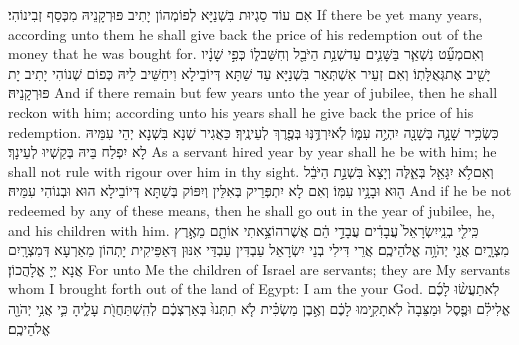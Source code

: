 {אִם עוֹד סַגְיוּת בִּשְׁנַיָּא לְפוֹמְהוֹן יָתִיב פּוּרְקָנֵיהּ מִכְּסַף זְבִינוֹהִי׃}
{If there be yet many years, according unto them he shall give back the price of his redemption out of the money that he was bought for.}{}
{וְאִם\maqqaf מְעַ֞ט נִשְׁאַ֧ר בַּשָּׁנִ֛ים עַד\maqqaf שְׁנַ֥ת הַיֹּבֵ֖ל וְחִשַּׁב\maqqaf ל֑וֹ כְּפִ֣י שָׁנָ֔יו יָשִׁ֖יב אֶת\maqqaf גְּאֻלָּתֽוֹ׃}
{וְאִם זְעֵיר אִשְׁתְּאַר בִּשְׁנַיָּא עַד שַׁתָּא דְּיוֹבֵילָא וִיחַשֵּׁיב לֵיהּ כְּפוֹם שְׁנוֹהִי יָתִיב יָת פּוּרְקָנֵיהּ׃}
{And if there remain but few years unto the year of jubilee, then he shall reckon with him; according unto his years shall he give back the price of his redemption.}{}
{כִּשְׂכִ֥יר שָׁנָ֛ה בְּשָׁנָ֖ה יִהְיֶ֣ה עִמּ֑וֹ לֹֽא\maqqaf יִרְדֶּ֥נּֽוּ בְּפֶ֖רֶךְ לְעֵינֶֽיךָ׃}
{כַּאֲגִיר שְׁנָא בִּשְׁנָא יְהֵי עִמֵּיהּ לָא יִפְלַח בֵּיהּ בְּקַשְׁיוּ לְעֵינָךְ׃}
{As a servant hired year by year shall he be with him; he shall not rule with rigour over him in thy sight.}{}
{וְאִם\maqqaf לֹ֥א יִגָּאֵ֖ל בְּאֵ֑לֶּה וְיָצָא֙ בִּשְׁנַ֣ת הַיֹּבֵ֔ל ה֖וּא וּבָנָ֥יו עִמּֽוֹ׃}
{וְאִם לָא יִתְפְּרֵיק בְּאִלֵּין וְיִפּוֹק בְּשַׁתָּא דְּיוֹבֵילָא הוּא וּבְנוֹהִי עִמֵּיהּ׃}
{And if he be not redeemed by any of these means, then he shall go out in the year of jubilee, he, and his children with him.}{}
{כִּֽי\maqqaf לִ֤י בְנֵֽי\maqqaf יִשְׂרָאֵל֙ עֲבָדִ֔ים עֲבָדַ֣י הֵ֔ם אֲשֶׁר\maqqaf הוֹצֵ֥אתִי אוֹתָ֖ם מֵאֶ֣רֶץ מִצְרָ֑יִם אֲנִ֖י יְהֹוָ֥ה אֱלֹהֵיכֶֽם׃}
{אֲרֵי דִּילִי בְנֵי יִשְׂרָאֵל עַבְדִּין עַבְדַּי אִנּוּן דְּאַפֵּיקִית יָתְהוֹן מֵאַרְעָא דְּמִצְרָֽיִם אֲנָא יְיָ אֱלָהֲכוֹן׃}
{For unto Me the children of Israel are servants; they are My servants whom I brought forth out of the land of Egypt: I am the \lord\space your God.}{}
\newperek
{}%
{לֹֽא\maqqaf תַעֲשׂ֨וּ לָכֶ֜ם אֱלִילִ֗ם וּפֶ֤סֶל וּמַצֵּבָה֙ לֹֽא\maqqaf תָקִ֣ימוּ לָכֶ֔ם וְאֶ֣בֶן מַשְׂכִּ֗ית לֹ֤א תִתְּנוּ֙ בְּאַרְצְכֶ֔ם לְהִֽשְׁתַּחֲוֺ֖ת עָלֶ֑יהָ כִּ֛י אֲנִ֥י יְהֹוָ֖ה אֱלֹהֵיכֶֽם׃}
